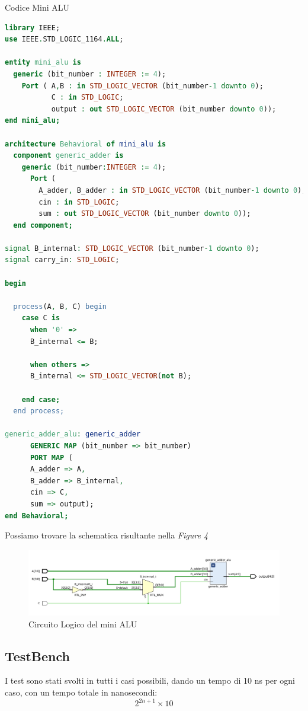\begin{problem}{Codice Mini ALU}{}
\begin{lstlisting}[language=VHDL]
library IEEE;
use IEEE.STD_LOGIC_1164.ALL;

entity mini_alu is
  generic (bit_number : INTEGER := 4);
    Port ( A,B : in STD_LOGIC_VECTOR (bit_number-1 downto 0);
           C : in STD_LOGIC;
           output : out STD_LOGIC_VECTOR (bit_number downto 0));
end mini_alu;

architecture Behavioral of mini_alu is
  component generic_adder is
    generic (bit_number:INTEGER := 4);
      Port ( 
        A_adder, B_adder : in STD_LOGIC_VECTOR (bit_number-1 downto 0);
        cin : in STD_LOGIC;
        sum : out STD_LOGIC_VECTOR (bit_number downto 0));
  end component;

signal B_internal: STD_LOGIC_VECTOR (bit_number-1 downto 0);
signal carry_in: STD_LOGIC;

begin
      
  process(A, B, C) begin
    case C is
      when '0' => 
      B_internal <= B;
            
      when others =>
      B_internal <= STD_LOGIC_VECTOR(not B);

    end case;
  end process;

generic_adder_alu: generic_adder 
      GENERIC MAP (bit_number => bit_number)
      PORT MAP (
      A_adder => A,
      B_adder => B_internal,
      cin => C,
      sum => output);
end Behavioral;
\end{lstlisting}
\end{problem}

Possiamo trovare la schematica risultante nella \textit{Figure 4}
\begin{figure}[H]
    \centering
    \includegraphics[width=15cm]{assets/schematics/generic_alu.png}
    \caption{Circuito Logico del mini ALU}
\end{figure}

\subsection{TestBench}
I test sono stati svolti in tutti i casi possibili, dando un tempo di 10 ns per ogni caso, con un tempo totale in nanosecondi: \begin{equation}2^{2n+1} \times 10\end{equation}

